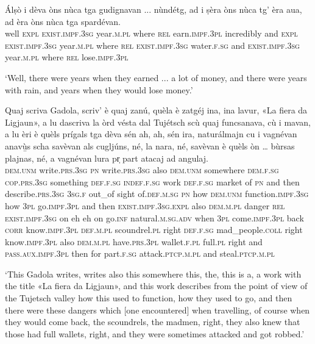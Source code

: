 \begin{linenumbers}
\gll Álṣò i dèva òns nùca tga gudignavan ... nùndétg, ad i ṣèra òns nùca tg’ èra aua, ad èra òns nùca tga spardévan.\\
well \textsc{expl} \textsc{exist.impf.3sg} year.\textsc{m.pl} where \textsc{rel} earn.\textsc{impf.3pl} {} incredibly and \textsc{expl} \textsc{exist.impf.3sg} year.\textsc{m.pl} where \textsc{rel} \textsc{exist.impf.3sg} water.\textsc{f.sg} and \textsc{exist.impf.3sg} year.\textsc{m.pl} where \textsc{rel} lose.\textsc{impf.3pl} \\
\end{linenumbers}
\medskip
\glt `Well, there were years when they earned ... a lot of money, and there were years with rain, and years when they would lose money.'
\medskip

\begin{linenumbers}
\gll Quaj scriva Gadola, scriv’ è quaj zanú, quèla è zatgéj ina, ina lavur, «La fiera da Ligjaun»\footnotemark, a lu dascriva la òrd vésta dal Tujétsch scù quaj funcsanava, cù i mavan, a lu èri è quèls prígals tga dèva sén ah, ah, sén ira, naturálmajn cu i vagnévan anavù̱s scha savèvan als cugljúns, né, la nara, né, savèvan è quèls òn … bùrsas plajnas, né, a vagnévan lura pr̩ part atacaj ad angulaj.\\
\textsc{dem.unm} write.\textsc{prs.3sg} \textsc{pn} write.\textsc{prs.3sg} also \textsc{dem.unm} somewhere \textsc{dem.f.sg} \textsc{cop.prs.3sg} something  \textsc{def.f.sg} \textsc{indef.f.sg} work \textsc{def.f.sg} market of \textsc{pn} and then describe.\textsc{prs.3sg} \textsc{3sg.f} out\_of sight of.\textsc{def.m.sg} \textsc{pn} how \textsc{dem.unm} function.\textsc{impf.3sg} how \textsc{3pl} go.\textsc{impf.3pl} and then \textsc{exist.impf.3sg.expl} also \textsc{dem.m.pl} danger \textsc{rel} \textsc{exist.impf.3sg} on eh eh on go.\textsc{inf} natural.\textsc{m.sg.adv} when \textsc{3pl} come.\textsc{impf.3pl} back \textsc{corr} know.\textsc{impf.3pl} \textsc{def.m.pl} scoundrel.\textsc{pl} right \textsc{def.f.sg} mad\_people.\textsc{coll} right know.\textsc{impf.3pl} also \textsc{dem.m.pl} have.\textsc{prs.3pl} {} wallet.\textsc{f.pl} full.\textsc{pl} right and \textsc{pass.aux.impf.3pl} then for part.\textsc{f.sg} attack.\textsc{ptcp.m.pl} and steal.\textsc{ptcp.m.pl}\\
\end{linenumbers}
\medskip
\glt `This Gadola writes, writes also this somewhere this, the, this is a, a work with the title «La fiera da Ligjaun», and this work describes from the point of view of the Tujetsch valley how this used to function, how they used to go, and then there were these dangers which [one encountered] when travelling, of course when they would come back, the scoundrels, the madmen, right, they also knew that those had full wallets, right, and they were sometimes attacked and got robbed.' 
\medskip

